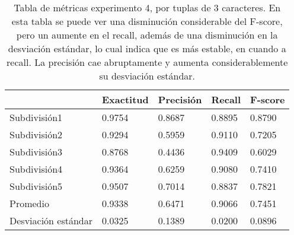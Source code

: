 \begin{table}[h]
	\centering
	\caption{Tabla de métricas experimento 4, por tuplas de 3 caracteres. En esta tabla se puede ver una disminución considerable del F-score, pero un aumente en el recall, además de una disminución en la desviación estándar, lo cual indica que es más estable, en cuando a recall. La precisión cae abruptamente y aumenta considerablemente su desviación estándar.}
\begin{tabular}{|l|llll|}
\hline
& Exactitud &     Precisión &     Recall  &   F-score \\ \hline
              
Subdivisión1            &       0.9754  &       0.8687  &       0.8895  &       0.8790  \\ 
Subdivisión2            &       0.9294  &       0.5959  &       0.9110  &       0.7205  \\ 
Subdivisión3            &       0.8768  &       0.4436  &       0.9409  &       0.6029  \\ 
Subdivisión4            &       0.9364  &       0.6259  &       0.9080  &       0.7410  \\ 
Subdivisión5            &       0.9507  &       0.7014  &       0.8837  &       0.7821  \\ \hline
Promedio                &       0.9338  &       0.6471  &       0.9066  &       0.7451  \\ \hline
Desviación estándar     &       0.0325  &       0.1389  &       0.0200  &       0.0896  \\ \hline



\end{tabular}
		     \label{tab:exp4}
\end{table}